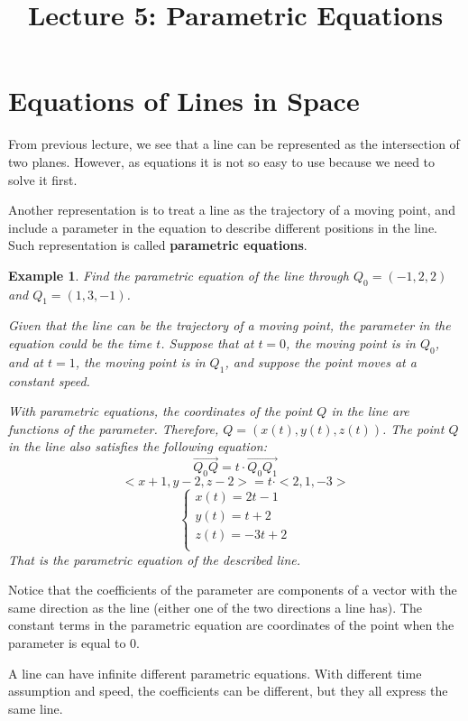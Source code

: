 \documentclass{article}
\title{Lecture 5: Parametric Equations}
\author{}
\date{}
\newtheorem{example}{Example}
\begin{document}
    
\maketitle

\section{Equations of Lines in Space}

From previous lecture, we see that a line can be represented as the intersection 
of two planes. However, as equations it is not so easy to use because we need to 
solve it first.

Another representation is to treat a line as the trajectory of a moving point, 
and include a parameter in the equation to describe different positions in the 
line. Such representation is called \textbf{parametric equations}.

\begin{example}
  Find the parametric equation of the line through $Q_0 = (-1, 2, 2)$ and 
  $Q_1 = (1, 3, -1)$.

  Given that the line can be the trajectory of a moving point, the parameter in 
  the equation could be the time $t$. Suppose that at $t = 0$, the moving point 
  is in $Q_0$, and at $t = 1$, the moving point is in $Q_1$, and suppose the 
  point moves at a constant speed.

  With parametric equations, the coordinates of the point $Q$ in the line are 
  functions of the parameter. Therefore, $Q = (x(t), y(t), z(t))$. The point $Q$ 
  in the line also satisfies the following equation:
  \[
    \vec{Q_0Q} = t \cdot \vec{Q_0Q_1}
  \]
  \[
    <x + 1, y - 2, z - 2> = t \cdot <2, 1, -3>
  \]
  \[
    \left\{ \begin{array}{ll}
    x(t) = 2t - 1 \\
    y(t) = t + 2 \\
    z(t) = -3t + 2 \\
    \end{array} \right.
  \]
  That is the parametric equation of the described line.
\end{example}

Notice that the coefficients of the parameter are components of a vector with 
the same direction as the line (either one of the two directions a line has). 
The constant terms in the parametric equation are coordinates of the point when 
the parameter is equal to 0.

A line can have infinite different parametric equations. With different time 
assumption and speed, the coefficients can be different, but they all express 
the same line.
\end{document}
